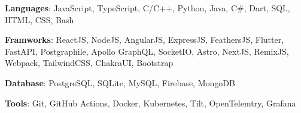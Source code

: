 \textbf{Languages}: JavaScript, TypeScript, C/C++, Python, Java, C\#, Dart, SQL, HTML, CSS, Bash \par
\textbf{Framworks}: ReactJS, NodeJS, AngularJS, ExpressJS, FeathersJS, Flutter, FastAPI, Postgraphile, Apollo GraphQL, SocketIO, Astro, NextJS, RemixJS, Webpack, TailwindCSS, ChakraUI, Bootstrap \par
\textbf{Database}: PostgreSQL, SQLite, MySQL, Firebase, MongoDB \par
\textbf{Tools}: Git, GitHub Actions, Docker, Kubernetes, Tilt, OpenTelemtry, Grafana 